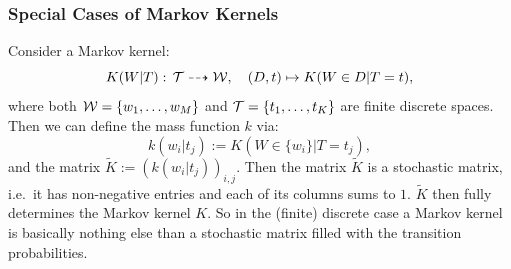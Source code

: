 \subsubsection{Special Cases of Markov Kernels}


\begin{Eg}
    Consider a Markov kernel:
    \[K(W|T):\, \mathcal{T} \dashrightarrow \mathcal{W},\quad (D,t) \mapsto K(W \in D|T=t),  \]
    where both $\mathcal{W}=\{w_1,\dots,w_M\}$ and $\mathcal{T}=\{t_1,\dots,t_K\}$ are finite discrete spaces.
    Then we can define the mass function $k$ via:
    \[  k(w_i|t_j) := K(W \in \{w_i\}|T=t_j),  \]
    and the matrix $\tilde K:=(k(w_i|t_j))_{i,j}$.
    Then the matrix $\tilde K$ is a stochastic matrix, i.e.\ it has non-negative entries and each of its columns sums to $1$. 
    $\tilde K$ then fully determines the Markov kernel $K$.
    So in the (finite) discrete case a Markov kernel is basically nothing else than a stochastic matrix filled with the transition probabilities.
\end{Eg}

